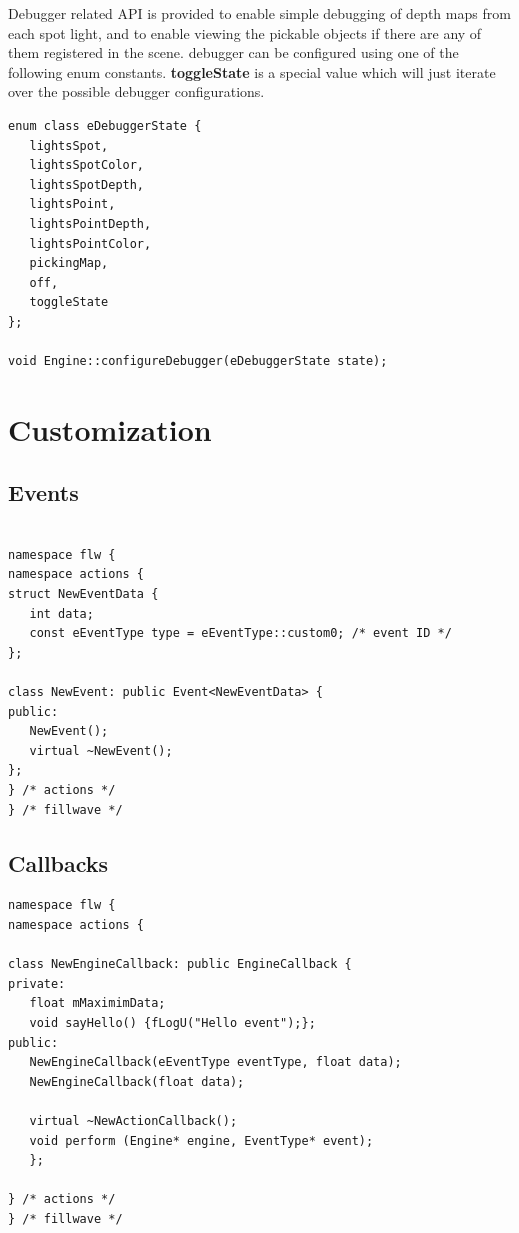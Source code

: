 \documentclass{article}
\begin{document}
\indent \indent Debugger related API is provided to enable simple debugging of depth maps from each spot light, and to enable viewing the pickable objects if there are any of them registered in the scene. debugger can be configured using one of the following enum constants. \textbf{toggleState} is a special value which will just iterate over the possible debugger configurations.

\begin{lstlisting}
enum class eDebuggerState {
   lightsSpot,
   lightsSpotColor,
   lightsSpotDepth,
   lightsPoint,
   lightsPointDepth,
   lightsPointColor,
   pickingMap,
   off,
   toggleState
};

void Engine::configureDebugger(eDebuggerState state);
\end{lstlisting}

\newpage

\section{Customization}

\subsection{Events}\label{sec:Custom events}
\begin{lstlisting}

namespace flw {
namespace actions {
struct NewEventData {
   int data;
   const eEventType type = eEventType::custom0; /* event ID */
};

class NewEvent: public Event<NewEventData> {
public:
   NewEvent();
   virtual ~NewEvent();
};
} /* actions */
} /* fillwave */
\end{lstlisting}
\subsection{Callbacks}\label{sec:Custom callbacks}
\begin{lstlisting}
namespace flw {
namespace actions {

class NewEngineCallback: public EngineCallback {
private:
   float mMaximimData;
   void sayHello() {fLogU("Hello event");};
public:
   NewEngineCallback(eEventType eventType, float data);
   NewEngineCallback(float data);

   virtual ~NewActionCallback();
   void perform (Engine* engine, EventType* event);
   };

} /* actions */
} /* fillwave */
\end{lstlisting}
\end{document}
